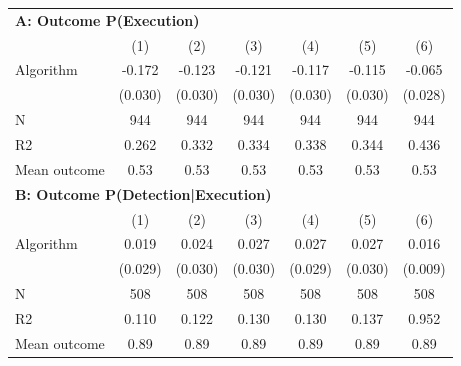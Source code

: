 \begin{tabular}{lcccccc} \toprule
\multicolumn{7}{l}{\textbf{A: Outcome P(Execution)}} \\ \multicolumn{1}{l}{} & (1) & (2) & (3) & (4) & (5) & (6) \\ \midrule
Algorithm   &      -0.172\sym{***}&      -0.123\sym{***}&      -0.121\sym{***}&      -0.117\sym{***}&      -0.115\sym{***}&      -0.065\sym{**} \\
            &     (0.030)         &     (0.030)         &     (0.030)         &     (0.030)         &     (0.030)         &     (0.028)         \\
\midrule
N           &         944         &         944         &         944         &         944         &         944         &         944         \\
R2          &       0.262         &       0.332         &       0.334         &       0.338         &       0.344         &       0.436         \\
Mean outcome&        0.53         &        0.53         &        0.53         &        0.53         &        0.53         &        0.53         \\

\midrule \multicolumn{7}{l}{\textbf{B: Outcome P(Detection|Execution)}} \\ \multicolumn{1}{l}{} & (1) & (2) & (3) & (4) & (5) & (6) \\ \midrule
Algorithm   &       0.019         &       0.024         &       0.027         &       0.027         &       0.027         &       0.016\sym{*}  \\
            &     (0.029)         &     (0.030)         &     (0.030)         &     (0.029)         &     (0.030)         &     (0.009)         \\
\midrule
N           &         508         &         508         &         508         &         508         &         508         &         508         \\
R2          &       0.110         &       0.122         &       0.130         &       0.130         &       0.137         &       0.952         \\
Mean outcome&        0.89         &        0.89         &        0.89         &        0.89         &        0.89         &        0.89         \\


\end{tabular}
